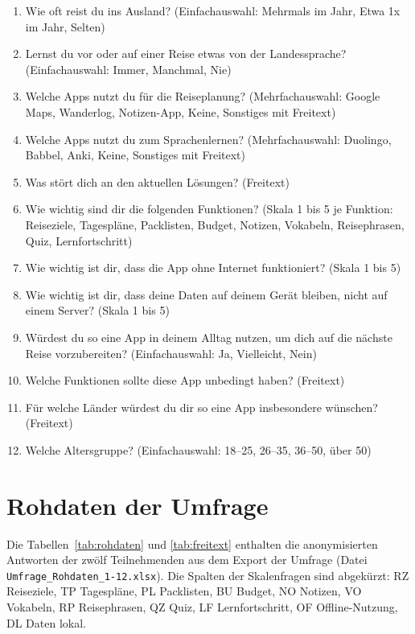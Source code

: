 \documentclass[12pt,a4paper]{scrreprt}
\begin{document}
\begin{enumerate}[label=\arabic*.]
    \item Wie oft reist du ins Ausland? (Einfachauswahl: Mehrmals im Jahr, Etwa 1x im Jahr, Selten)
    \item Lernst du vor oder auf einer Reise etwas von der Landessprache? (Einfachauswahl: Immer, Manchmal, Nie)
    \item Welche Apps nutzt du für die Reiseplanung? (Mehrfachauswahl: Google Maps, Wanderlog, Notizen-App, Keine, Sonstiges mit Freitext)
    \item Welche Apps nutzt du zum Sprachenlernen? (Mehrfachauswahl: Duolingo, Babbel, Anki, Keine, Sonstiges mit Freitext)
    \item Was stört dich an den aktuellen Lösungen? (Freitext)
    \item Wie wichtig sind dir die folgenden Funktionen? (Skala 1 bis 5 je Funktion: Reiseziele, Tagespläne, Packlisten, Budget, Notizen, Vokabeln, Reisephrasen, Quiz, Lernfortschritt)
    \item Wie wichtig ist dir, dass die App ohne Internet funktioniert? (Skala 1 bis 5)
    \item Wie wichtig ist dir, dass deine Daten auf deinem Gerät bleiben, nicht auf einem Server? (Skala 1 bis 5)
    \item Würdest du so eine App in deinem Alltag nutzen, um dich auf die nächste Reise vorzubereiten? (Einfachauswahl: Ja, Vielleicht, Nein)
    \item Welche Funktionen sollte diese App unbedingt haben? (Freitext)
    \item Für welche Länder würdest du dir so eine App insbesondere wünschen? (Freitext)
    \item Welche Altersgruppe? (Einfachauswahl: 18--25, 26--35, 36--50, über 50)
\end{enumerate}

\clearpage
\chapter{Rohdaten der Umfrage}
Die Tabellen~\ref{tab:rohdaten} und \ref{tab:freitext} enthalten die anonymisierten Antworten der zwölf Teilnehmenden aus dem Export der Umfrage (Datei \texttt{Umfrage\_Rohdaten\_1-12.xlsx}). Die Spalten der Skalenfragen sind abgekürzt: RZ Reiseziele, TP Tagespläne, PL Packlisten, BU Budget, NO Notizen, VO Vokabeln, RP Reisephrasen, QZ Quiz, LF Lernfortschritt, OF Offline-Nutzung, DL Daten lokal.
\end{document}
